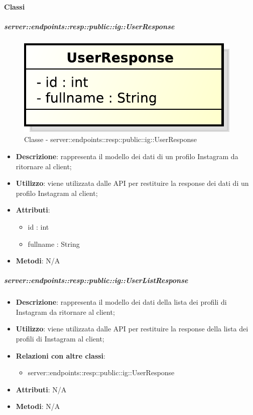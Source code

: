 	\paragraph{Classi} %

    \subparagraph{server::endpoints::resp::public::ig::UserResponse} %
    \label{subp:bdsm_app_server_endpoints_resp_public_ig_userresponse}
	\begin{figure}[!htbp]
		\centering
		\centerline{\includegraphics[scale=0.6]{./images/server/classes/endpoints/ig/user_response.pdf}}
		\caption{Classe - server::endpoints::resp::public::ig::UserResponse}
	\end{figure}
    \begin{itemize}
      \item \textbf{Descrizione}: rappresenta il modello dei dati di un profilo Instagram da ritornare al client;
      \item \textbf{Utilizzo}: viene utilizzata dalle API per restituire la response dei dati di un profilo Instagram al client;

	  \item \textbf{Attributi}:
	  	\begin{itemize}
	  		\item id : int
	  		\item fullname : String
	  	\end{itemize}
	  \item \textbf{Metodi}: N/A
      \end{itemize}

    \subparagraph{server::endpoints::resp::public::ig::UserListResponse} %
    \label{subp:bdsm_app_server_endpoints_resp_public_ig_userlistresponse}
    \begin{itemize}
      \item \textbf{Descrizione}: rappresenta il modello dei dati della lista dei profili di Instagram da ritornare al client;
      \item \textbf{Utilizzo}: viene utilizzata dalle API per restituire la response della lista dei profili di Instagram al client;
      \item \textbf{Relazioni con altre classi}:
        \begin{itemize}
          \item server::endpoints::resp::public::ig::UserResponse
        \end{itemize}
	  \item \textbf{Attributi}: N/A
	  \item \textbf{Metodi}: N/A
      \end{itemize}

